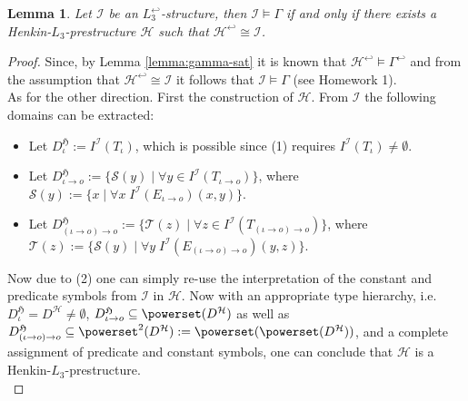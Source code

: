 \documentclass[11pt,a4paper]{article}
\newtheorem{lemma}[theorem]{Lemma}
\newcommand{\tofo}{\hookleftarrow}
\newcommand{\of}{\iota }
\newcommand{\os}{\iota \to o}
\newcommand{\ot}{(\iota \to o)\to o}
\begin{document}
\begin{lemma}
\label{lemma:fo-iso}
Let $\mathcal{I}$ be an $L_3^{\tofo}$-structure, then $\mathcal{I}\models \Gamma$ if and only if there exists a Henkin-$L_3$-prestructure $\mathcal{H}$ such that $\mathcal{H}^{\tofo}\cong\mathcal{I}$.
\end{lemma}
\begin{proof}
Since, by Lemma \ref{lemma:gamma-sat} it is known that $\mathcal{H}^{\tofo}\models \Gamma^{\tofo}$ and from the assumption that $\mathcal{H}^{\tofo} \cong \mathcal{I}$ it follows that $\mathcal{I}\models \Gamma$ (see Homework 1). \\

As for the other direction. First the construction of $\mathcal{H}$. From $\mathcal{I}$ the following domains can be extracted:
\begin{itemize}
\item Let $D_{\of}^{\mathfrak{H}}:=I^{\mathcal{I}}(T_{\of})$, which is possible since (1) requires $I^{\mathcal{I}}(T_{\of}) \neq \emptyset$.
\item Let $D_{\os}^{\mathfrak{H}}:=\{ \mathcal{S}(y) \mid \forall  y \in I^{\mathcal{I}}(T_{\os})\}$, where $\mathcal{S}(y):= \{ x \mid \forall x \; I^{\mathcal{I}}(E_{\os})(x,y)\}$.
\item Let $D_{\ot}^{\mathfrak{H}}:=\{\mathcal{T}(z) \mid \forall  z \in I^{\mathcal{I}}(T_{\ot})\}$, where $\mathcal{T}(z):=\{ \mathcal{S}(y) \mid \forall y \;   I^{\mathcal{I}}(E_{\ot})(y,z)\}$.
\end{itemize}
Now due to (2) one can simply re-use the interpretation of the constant and predicate symbols from $\mathcal{I}$ in $\mathcal{H}$. Now with an appropriate type hierarchy, i.e. $D_{\of}^{\mathfrak{H}} = D^{\mathcal{H}} \neq \emptyset$, $D_{\os}^{\mathfrak{H}} \subseteq  \powerset(D^{\mathcal{H}})$ as well as $D_{\ot}^{\mathfrak{H}} \subseteq  \powerset^2(D^{\mathcal{H}}):= \powerset(\powerset(D^{\mathcal{H}}))$, and a complete assignment of predicate and constant symbols, one can conclude that $\mathcal{H}$ is a Henkin-$L_3$-prestructure. \\


\end{proof}
\end{document}
